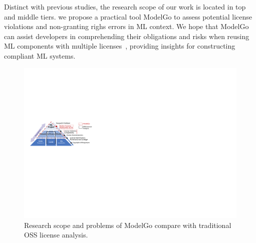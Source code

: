 Distinct with previous studies, the research scope of our work is located in top and middle tiers.
we propose a practical tool ModelGo to assess potential license violations and non-granting righs errors in ML context.
We hope that ModelGo can assist developers in comprehending their obligations and risks when reusing ML components with multiple licenses~\cite{almeida2017software}, providing insights for constructing compliant ML systems.


\begin{figure}[t]
    \centering
    \includegraphics[width=\linewidth]{fig/pyramid.pdf}
    \caption{Research scope and problems of ModelGo compare with traditional OSS license analysis.}
    \Description{}
    \label{fig:pyramid}
    \vspace{-5mm}
\end{figure}



